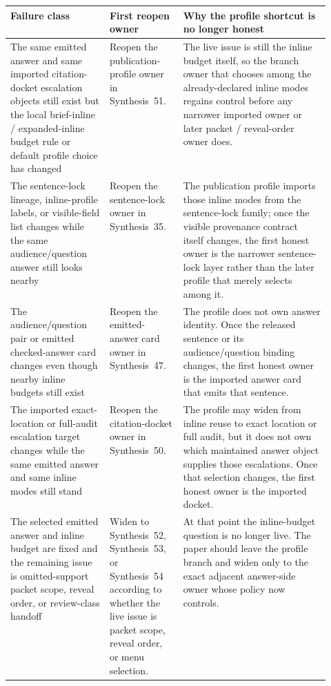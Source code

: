 \documentclass[11pt]{article}
\begin{document}
\begin{table}[t]
\centering
\small
\begin{tabularx}{\linewidth}{@{}p{0.31\linewidth}p{0.23\linewidth}X@{}}
\toprule
Failure class & First reopen owner & Why the profile shortcut is no longer honest \\
\midrule
The same emitted answer and same imported citation-docket escalation objects still exist but the local brief-inline / expanded-inline budget rule or default profile choice has changed & Reopen the publication-profile owner in Synthesis~51. & The live issue is still the inline budget itself, so the branch owner that chooses among the already-declared inline modes regains control before any narrower imported owner or later packet / reveal-order owner does. \\
The sentence-lock lineage, inline-profile labels, or visible-field list changes while the same audience/question answer still looks nearby & Reopen the sentence-lock owner in Synthesis~35. & The publication profile imports those inline modes from the sentence-lock family; once the visible provenance contract itself changes, the first honest owner is the narrower sentence-lock layer rather than the later profile that merely selects among it. \\
The audience/question pair or emitted checked-answer card changes even though nearby inline budgets still exist & Reopen the emitted-answer card owner in Synthesis~47. & The profile does not own answer identity. Once the released sentence or its audience/question binding changes, the first honest owner is the imported answer card that emits that sentence. \\
The imported exact-location or full-audit escalation target changes while the same emitted answer and same inline modes still stand & Reopen the citation-docket owner in Synthesis~50. & The profile may widen from inline reuse to exact location or full audit, but it does not own which maintained answer object supplies those escalations. Once that selection changes, the first honest owner is the imported docket. \\
The selected emitted answer and inline budget are fixed and the remaining issue is omitted-support packet scope, reveal order, or review-class handoff & Widen to Synthesis~52, Synthesis~53, or Synthesis~54 according to whether the live issue is packet scope, reveal order, or menu selection. & At that point the inline-budget question is no longer live. The paper should leave the profile branch and widen only to the exact adjacent answer-side owner whose policy now controls. \\

\end{tabularx}
\end{table}
\end{document}
